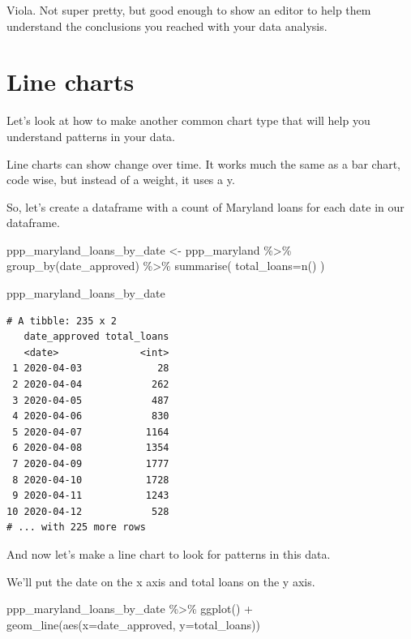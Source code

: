 \documentclass[
  letterpaper,
  DIV=11,
  numbers=noendperiod]{scrreprt}
\newenvironment{Shaded}{\begin{snugshade}}{\end{snugshade}}
\newcommand{\AttributeTok}[1]{\textcolor[rgb]{0.40,0.45,0.13}{#1}}
\newcommand{\FunctionTok}[1]{\textcolor[rgb]{0.28,0.35,0.67}{#1}}
\newcommand{\NormalTok}[1]{\textcolor[rgb]{0.00,0.23,0.31}{#1}}
\newcommand{\OtherTok}[1]{\textcolor[rgb]{0.00,0.23,0.31}{#1}}
\newcommand{\SpecialCharTok}[1]{\textcolor[rgb]{0.37,0.37,0.37}{#1}}
\begin{document}
Viola. Not super pretty, but good enough to show an editor to help them
understand the conclusions you reached with your data analysis.

\hypertarget{line-charts}{%
\section{Line charts}\label{line-charts}}

Let's look at how to make another common chart type that will help you
understand patterns in your data.

Line charts can show change over time. It works much the same as a bar
chart, code wise, but instead of a weight, it uses a y.

So, let's create a dataframe with a count of Maryland loans for each
date in our dataframe.

\begin{Shaded}
\begin{Highlighting}[]
\NormalTok{ppp\_maryland\_loans\_by\_date }\OtherTok{\textless{}{-}}\NormalTok{ ppp\_maryland }\SpecialCharTok{\%\textgreater{}\%}
  \FunctionTok{group\_by}\NormalTok{(date\_approved) }\SpecialCharTok{\%\textgreater{}\%}
  \FunctionTok{summarise}\NormalTok{(}
    \AttributeTok{total\_loans=}\FunctionTok{n}\NormalTok{()}
\NormalTok{  )}

\NormalTok{ppp\_maryland\_loans\_by\_date}
\end{Highlighting}
\end{Shaded}

\begin{verbatim}
# A tibble: 235 x 2
   date_approved total_loans
   <date>              <int>
 1 2020-04-03             28
 2 2020-04-04            262
 3 2020-04-05            487
 4 2020-04-06            830
 5 2020-04-07           1164
 6 2020-04-08           1354
 7 2020-04-09           1777
 8 2020-04-10           1728
 9 2020-04-11           1243
10 2020-04-12            528
# ... with 225 more rows
\end{verbatim}

And now let's make a line chart to look for patterns in this data.

We'll put the date on the x axis and total loans on the y axis.

\begin{Shaded}
\begin{Highlighting}[]
\NormalTok{ppp\_maryland\_loans\_by\_date }\SpecialCharTok{\%\textgreater{}\%}
  \FunctionTok{ggplot}\NormalTok{() }\SpecialCharTok{+}
  \FunctionTok{geom\_line}\NormalTok{(}\FunctionTok{aes}\NormalTok{(}\AttributeTok{x=}\NormalTok{date\_approved, }\AttributeTok{y=}\NormalTok{total\_loans))}
\end{Highlighting}
\end{Shaded}
\end{document}
